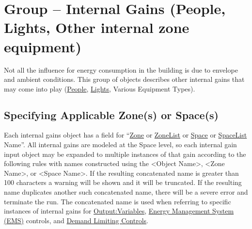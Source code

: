 \section[Group -- Internal Gains]{Group -- Internal Gains (People, Lights, Other internal zone equipment)}\label{group-internal-gains-people-lights-other-internal-zone-equipment}

Not all the influence for energy consumption in the building is due to envelope and ambient conditions. This group of objects describes other internal gains that may come into play (\hyperref[people]{People}, \hyperref[lights-000]{Lights}, Various Equipment Types).

\subsection{Specifying Applicable Zone(s) or Space(s)}\label{specifying-applicable-zones-or-spaces}
Each internal gains object has a field for ``\hyperref[zone]{Zone} or  \hyperref[zonelist]{ZoneList} or \hyperref[space]{Space} or  \hyperref[spacelist]{SpaceList} Name''. All internal gains are modeled at the Space level, so each internal gain input object may be expanded to multiple instances of that gain according to the following rules with names constructed using the \textless{}Object Name\textgreater{}, \textless{}Zone Name\textgreater{}, or \textless{}Space Name\textgreater{}. If the resulting concatenated name is greater than 100 characters a warning will be shown and it will be truncated. If the resulting name duplicates another such concatenated name, there will be a severe error and terminate the run. The concatenated name is used when referring to specific instances of internal gains for \hyperref[outputvariable]{Output:Variables}, \hyperref[group-energy-management-system-ems]{Energy Management System (EMS)} controls, and \hyperref[group-demand-limiting-controls]{Demand Limiting Controls}.

